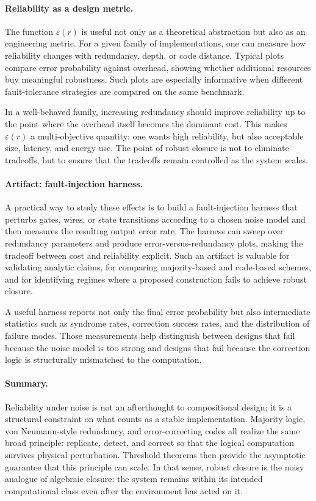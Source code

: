 \documentclass[11pt]{article}
\begin{document}
\paragraph{Reliability as a design metric.}
The function \(\varepsilon(r)\) is useful not only as a theoretical abstraction but also as an engineering metric. For a given family of implementations, one can measure how reliability changes with redundancy, depth, or code distance. Typical plots compare error probability against overhead, showing whether additional resources buy meaningful robustness. Such plots are especially informative when different fault-tolerance strategies are compared on the same benchmark.

In a well-behaved family, increasing redundancy should improve reliability up to the point where the overhead itself becomes the dominant cost. This makes \(\varepsilon(r)\) a multi-objective quantity: one wants high reliability, but also acceptable size, latency, and energy use. The point of robust closure is not to eliminate tradeoffs, but to ensure that the tradeoffs remain controlled as the system scales.

\paragraph{Artifact: fault-injection harness.}
A practical way to study these effects is to build a fault-injection harness that perturbs gates, wires, or state transitions according to a chosen noise model and then measures the resulting output error rate. The harness can sweep over redundancy parameters and produce error-versus-redundancy plots, making the tradeoff between cost and reliability explicit. Such an artifact is valuable for validating analytic claims, for comparing majority-based and code-based schemes, and for identifying regimes where a proposed construction fails to achieve robust closure.

A useful harness reports not only the final error probability but also intermediate statistics such as syndrome rates, correction success rates, and the distribution of failure modes. Those measurements help distinguish between designs that fail because the noise model is too strong and designs that fail because the correction logic is structurally mismatched to the computation.

\paragraph{Summary.}
Reliability under noise is not an afterthought to compositional design; it is a structural constraint on what counts as a stable implementation. Majority logic, von Neumann-style redundancy, and error-correcting codes all realize the same broad principle: replicate, detect, and correct so that the logical computation survives physical perturbation. Threshold theorems then provide the asymptotic guarantee that this principle can scale. In that sense, robust closure is the noisy analogue of algebraic closure: the system remains within its intended computational class even after the environment has acted on it.
\end{document}
